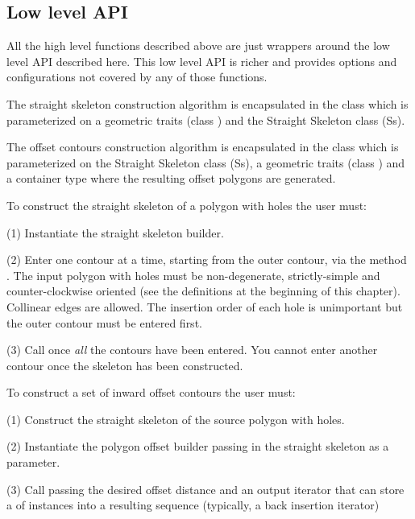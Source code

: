 \subsection{Low level API}

All the high level functions described above are just wrappers around the low level 
API described here. This low level API is richer and provides options and configurations 
not covered by any of those functions.

The straight skeleton construction algorithm is encapsulated in the
class  which is
parameterized on a geometric traits (class
) and the Straight
Skeleton class (Ss).

The offset contours construction algorithm is encapsulated in the class
 which is
parameterized on the Straight Skeleton class (Ss), a
geometric traits (class )
and a container type where the resulting offset polygons are
generated.

To construct the straight skeleton of a polygon with holes the user must:
 
(1) Instantiate the straight skeleton builder.

(2) Enter one contour at a time, starting from the outer contour, via
    the method . The input polygon with holes must be 
    non-degenerate, strictly-simple and counter-clockwise oriented
    (see the definitions at the beginning of this chapter).
    Collinear edges are allowed. The insertion order of each hole
    is unimportant but the outer contour must be entered first.

(3) Call  once \textit{all} the contours have been entered. You
cannot enter another contour once the skeleton has been constructed.

To construct a set of inward offset contours the user must:
 
(1) Construct the straight skeleton of the source polygon with holes.

(2) Instantiate the polygon offset builder passing in the straight skeleton as a parameter.

(3) Call  passing the desired offset
    distance and an output iterator that can store a
     of  instances 
    into a resulting sequence (typically, a back insertion iterator)
    
